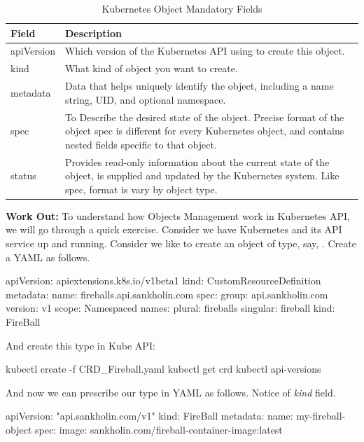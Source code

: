 \begin{table}[H]
\centering
    \begin{tabular}{ | l | p{11cm} |}
    \hline
    Field & Description \\ \hline
    apiVersion & Which version of the Kubernetes API using to create this object. \\ \hline
    kind & What kind of object you want to create. \\ \hline
    metadata & Data that helps uniquely identify the object, including a name string, UID, and optional namespace. \\ \hline
    spec & To Describe the desired state of the object. Precise format of the object spec is different for every Kubernetes object, and contains nested fields specific to that object. \\ \hline
    status & Provides read-only information about the current state of the object, is supplied and updated by the Kubernetes system. Like spec, format is vary by object type. \\
    \hline
    \end{tabular}
\caption{Kubernetes Object Mandatory Fields}
\label{kubeObjectTable}
\end{table}

\noindent\textbf{Work Out:} \quad To understand how Objects Management work in Kubernetes API, we will go through a quick exercise. Consider we have Kubernetes and its API service up and running. Consider we like to create an object of type, say, . Create a YAML as follows.

\begin{lcverbatim}
apiVersion: apiextensions.k8s.io/v1beta1
kind: CustomResourceDefinition
metadata:
  name: fireballs.api.sankholin.com
spec:
  group: api.sankholin.com
  version: v1
  scope: Namespaced
  names:
    plural: fireballs
    singular: fireball
    kind: FireBall
\end{lcverbatim}

\noindent And create this  type in Kube API:
\begin{lcverbatim}
kubectl create -f CRD_Fireball.yaml
kubectl get crd
kubectl api-versions
\end{lcverbatim}

\noindent And now we can prescribe our  type in YAML as follows. Notice of \emph{kind} field.

\begin{lcverbatim}
apiVersion: "api.sankholin.com/v1"
kind: FireBall
metadata:
  name: my-fireball-object
spec:
  image: sankholin.com/fireball-container-image:latest
\end{lcverbatim}

